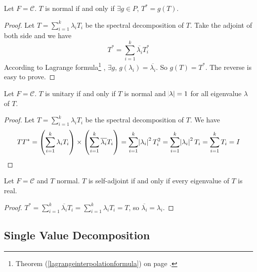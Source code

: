 \begin{theorem}
    Let $F=\mathcal{C}$. $T$ is normal if and only if $\exists g \in P$, $T^* = g(T)$.
\end{theorem}
\begin{proof}
    Let $\displaystyle T = \sum_{i=1}^k \lambda_i T_i$ be the spectral decomposition of $T$. Take the adjoint of both side and we have
    \begin{equation}
        T^* = \sum_{i=1}^k \overline{\lambda_i} T_i^*
    \end{equation}
    According to Lagrange formula\footnote{Theorem (\ref{lagrangeinterpolationformula}) on page \pageref{lagrangeinterpolationformula}.} , $\exists g$, $g(\lambda_i) = \overline{\lambda_i}$. So $g(T) = T^*$. The reverse is easy to prove.
\end{proof}

\begin{theorem}
    Let $F=\mathcal{C}$. $T$ is unitary if and only if $T$ is normal and $\abs{\lambda} = 1$ for all eigenvalue $\lambda$ of $T$.
\end{theorem}
\begin{proof}
    Let $\displaystyle T = \sum_{i=1}^k \lambda_i T_i$ be the spectral decomposition of $T$. We have
    \begin{equation*}
    TT^* = \mleft( \sum_{i=1}^k \lambda_i T_i  \mright) \times \mleft( \sum_{i=1}^k \overline{\lambda_i} T_i \mright) = \sum_{i=1}^k \absolutevalue{\lambda_i}^2 T_i^2 = \sum_{i=1}^k \absolutevalue{\lambda_i}^2 T_i = \sum_{i=1}^k T_i  = I    
    \end{equation*}
\end{proof}


\begin{theorem}
    Let $F=\mathcal{C}$ and $T$ normal. $T$ is self-adjoint if and only if every eigenvalue of $T$ is real.    
\end{theorem}
\begin{proof}
    $\displaystyle T^* = \sum_{i=1}^k \overline{\lambda_i} T_i = \sum_{i=1}^k \lambda_i T_i = T$, so $\overline{\lambda_i} = \lambda_i$.
\end{proof}



\subsection{Single Value Decomposition}

